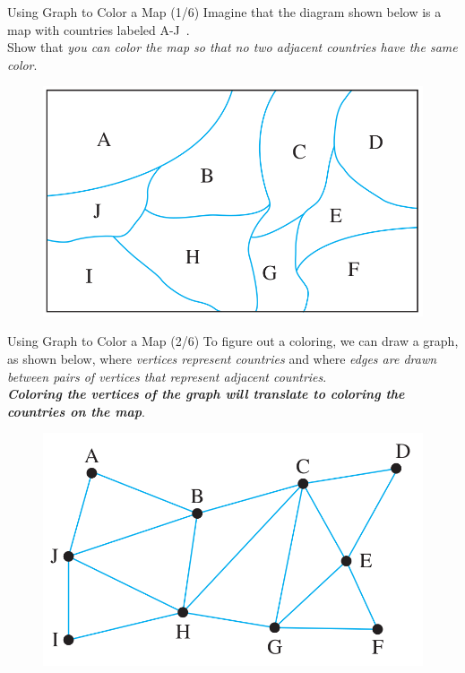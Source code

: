 \documentclass[english,t]{beamer}
\begin{document}
\begin{frame}{Using Graph to Color a Map (1/6)}
	Imagine that the diagram shown below is a map with countries labeled A-J~\citep{epp2020discrete}. \\
	Show that \textit{you can color the map so that no two adjacent countries have the same color}.	
	\begin{figure}[!ht]
		\centering
		\includegraphics[scale=.25]{images/map-coloring-1}
	\end{figure}
\end{frame}

\begin{frame}{Using Graph to Color a Map (2/6)}
	To figure out a coloring, we can draw a graph, as shown below, where \textit{vertices represent countries} and where \textit{edges
		are drawn between pairs of vertices that represent adjacent countries}. \\
	\textit{\textbf{Coloring the vertices of the graph will translate to coloring the countries on the map}}.
	\begin{figure}[!ht]
		\centering
		\includegraphics[scale=.25]{images/map-coloring-2}
	\end{figure}
\end{frame}
\end{document}
